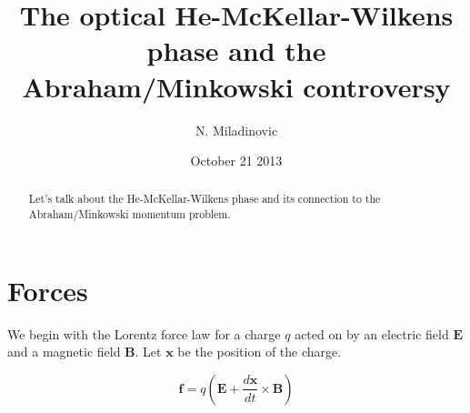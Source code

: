 \documentclass[twocolumn,english,pra,aps,superscriptaddress,floatfix]{revtex4-1}
\begin{document}
\author{N. Miladinovic}


\title{The optical He-McKellar-Wilkens phase and the Abraham/Minkowski controversy}
\date{October 21 2013}
\begin{abstract}
\label{sec:abstract}

Let's talk about the He-McKellar-Wilkens phase and its connection to the Abraham/Minkowski momentum problem.  
\end{abstract}


\maketitle

\section{Forces}
\label{sec:forces}

We begin with the Lorentz force law for a charge $q$ acted on by an electric field $\mathbf{E}$ and a magnetic field $\mathbf{B}$. Let $\mathbf{x}$ be the position of the charge.

\begin{equation}
\mathbf{f}=q\left(\mathbf{E}+\frac{d\mathbf{x}}{dt}\times\mathbf{B}\right)
\label{lorentz}
\end{equation}
\end{document}
